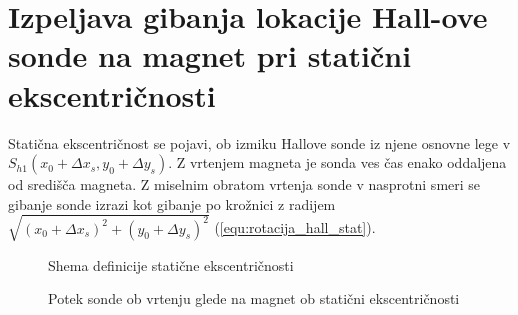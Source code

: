 \section{Izpeljava gibanja lokacije Hall-ove sonde na magnet pri statični ekscentričnosti}

Statična ekscentričnost se pojavi, ob izmiku Hallove sonde iz njene osnovne lege v  $S_{h1}(x_0+\Delta x_s, y_0+\Delta y_s)$. Z vrtenjem magneta je sonda ves čas enako oddaljena od središča magneta. Z miselnim obratom vrtenja sonde v nasprotni smeri se gibanje sonde izrazi kot gibanje po krožnici z radijem $\sqrt{(x_0+\Delta x_s)^2+(y_0+\Delta y_s)^2}$ (\ref{equ:rotacija_hall_stat}).


\begin{figure}[h!]
	\centering
	\caption{Shema definicije statične ekscentričnosti}
	\label{fig:def_sta_eks}
\end{figure}



\begin{figure}[h!]
	\centering
	\caption{Potek sonde ob vrtenju glede na magnet ob statični ekscentričnosti}
	\label{fig:def_sta_eks_stat}
\end{figure}




